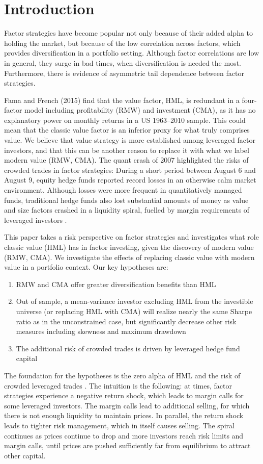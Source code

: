 \section{Introduction}
Factor strategies have become popular not only because of their added alpha to holding the market, but because of the low correlation across factors, which provides diversification in
a portfolio setting. Although factor correlations are low in
general, they surge in bad times, when diversification is needed the most. Furthermore, there is evidence of asymmetric tail dependence between factor strategies.

Fama and French (2015) find that the value factor, HML, is redundant in a four-factor model including profitability (RMW) and investment (CMA), as it has no explanatory power on monthly returns
in a US 1963–2010 sample. This could mean that the classic value factor is an inferior proxy for what truly comprises value. We believe that value strategy is more established among leveraged factor investors, and that this can be another reason to replace it with what we label modern value (RMW, CMA). The quant crash of 2007 highlighted the risks of crowded trades in factor strategies: During a short period between August 6 and August 9, equity hedge funds reported record losses in an otherwise calm market environment. Although losses were more frequent in quantitatively managed funds, traditional hedge funds also lost substantial amounts of money as value and size factors crashed in a liquidity spiral, fuelled by margin requirements of leveraged investors \autocite{KhandaniLo2011}.

This paper takes a risk perspective on factor strategies and investigates what role classic value (HML) has in factor investing, given the discovery of modern value (RMW, CMA). We investigate the effects of replacing classic value with modern value in a portfolio context. Our key hypotheses are:
\begin{enumerate}
	\item RMW and CMA offer greater diversification benefits than HML
	\item Out of sample, a mean-variance investor excluding HML from the investible universe (or replacing HML with CMA) will realize nearly the same Sharpe ratio as in the unconstrained case, but significantly decrease other risk measures including skewness and maximum drawdown
	\item The additional risk of crowded trades is driven by leveraged hedge fund capital
\end{enumerate}
The foundation for the hypotheses is the zero alpha of HML \autocite{FF2015} and the risk of crowded leveraged trades \autocite{Brunnermeier2009}. The intuition is the following: at times, factor strategies experience a negative return shock, which leads to margin calls for some leveraged investors. The margin calls lead to additional selling, for which there is not enough liquidity to maintain prices. In parallel, the return shock leads to tighter risk management, which in itself causes selling. The spiral continues as prices continue to drop and more investors reach risk limits and margin calls, until prices are pushed sufficiently far from equilibrium to attract other capital.

